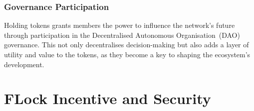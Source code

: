 \documentclass[conference]{IEEEtran}
\begin{document}
\subsubsection{Governance Participation} Holding \FML tokens grants members the power to influence the network's future through participation in the Decentralised Autonomous Organisation~(DAO) governance. This not only decentralises decision-making but also adds a layer of utility and value to the tokens, as they become a key to shaping the ecosystem's development.





    






\section{FLock Incentive and Security}
\end{document}

